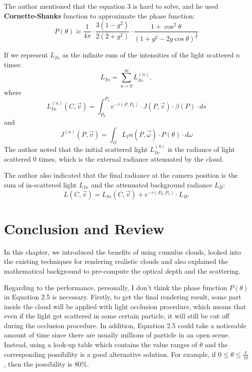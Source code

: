 The author mentioned that the equation 3 is hard to solve, and he used \textbf{Cornette-Shanks} function to approximate the phase function:
\begin{equation}
P(\theta) \approx \frac{1}{4\pi} \cdot \frac{3(1-g^2)}{2(2+g^2)} \cdot \frac{1+\cos^2 {\theta}}{(1+g^2-2g\cos{\theta})^{\frac{3}{2}}}
\end{equation}

If we represent $L_{In}$ as the infinite sum of the intensities of the light scattered $n$ times:
\begin{equation}
L_{In} = \sum_{n=0}^{\infty}L_{In}^{(n)},
\end{equation}
where
\begin{equation}
L_{In}^{(n)}(C, \vec{v}) = \int_{P_0}^{P_1}e^{-\tau(P, P_0)} \cdot J(P, \vec{v}) \cdot \beta(P) \cdot ds
\end{equation}
and
\begin{equation}
J^{(n)}(P, \vec{v}) = \int_{\Omega}L_In(P, \vec{\omega}) \cdot P(\theta) \cdot d\omega
\end{equation}
The author noted that the initial scattered light $L_{In}^{(0)}$ is the radiance of light scattered 0 times, which is the external radiance attenuated by the cloud.

The author also indicated that the final radiance at the camera position is the sum of in-scattered light $L_{In}$ and the attenuated background radiance $L_B$:
\begin{equation}
L(C, \vec{v}) = L_{In}(C, \vec{v}) + e^{-\tau(P_0, P_1)} \cdot L_B.
\end{equation}

\section{Conclusion and Review}
In this chapter, we introduced the benefits of using cumulus clouds, looked into the existing techniques for rendering realistic clouds and also explained the mathematical background to pre-compute the optical depth and the scattering.

Regarding to the performance, personally, I don't think the phase function $P(\theta)$ in Equation 2.5 is necessary. Firstly, to get the final rendering result, some part inside the cloud will be applied with light occlusion procedure, which means that even if the light get scattered in some certain particle, it will still be cut off during the occlusion procedure. In addition, Equation 2.5 could take a noticeable amount of time since there are usually millions of particle in an open scene. Instead, using a look-up table which contains the value ranges of $\theta$ and the corresponding possibility is a good alternative solution. For example, if $0 \leq \theta \leq \frac{\pi}{10}$, then the possibility is $80\%$.